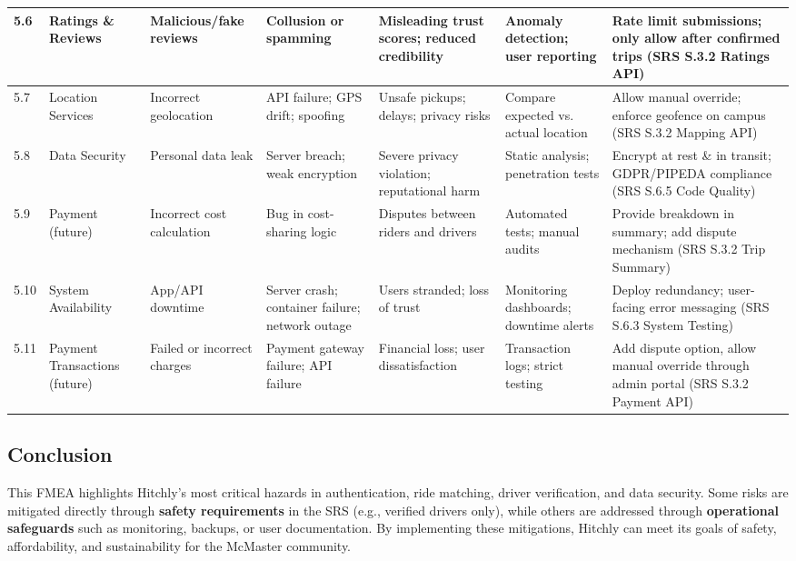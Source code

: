 \documentclass{article}
\begin{document}
\begin{longtable}{|p{0.5cm}|p{2cm}|p{2cm}|p{2cm}|p{2cm}|p{2cm}|p{2cm}|}
5.6 & Ratings \& Reviews & Malicious/fake reviews & Collusion or spamming & Misleading trust scores; reduced credibility & Anomaly detection; user reporting & Rate limit submissions; only allow after confirmed trips (SRS S.3.2 Ratings API) \\ \hline

5.7 & Location Services & Incorrect geolocation & API failure; GPS drift; spoofing & Unsafe pickups; delays; privacy risks & Compare expected vs. actual location & Allow manual override; enforce geofence on campus (SRS S.3.2 Mapping API) \\ \hline

5.8 & Data Security & Personal data leak & Server breach; weak encryption & Severe privacy violation; reputational harm & Static analysis; penetration tests & Encrypt at rest \& in transit; GDPR/PIPEDA compliance (SRS S.6.5 Code Quality) \\ \hline

5.9 & Payment (future) & Incorrect cost calculation & Bug in cost-sharing logic & Disputes between riders and drivers & Automated tests; manual audits & Provide breakdown in summary; add dispute mechanism (SRS S.3.2 Trip Summary) \\ \hline

5.10 & System Availability & App/API downtime & Server crash; container failure; network outage & Users stranded; loss of trust & Monitoring dashboards; downtime alerts & Deploy redundancy; user-facing error messaging (SRS S.6.3 System Testing) \\ \hline

5.11 & Payment Transactions (future) & Failed or incorrect charges & Payment gateway failure; API failure & Financial loss; user dissatisfaction & Transaction logs; strict testing & Add dispute option, allow manual override through admin portal (SRS S.3.2 Payment API) \\ \hline

\end{longtable}
\endgroup



\subsection{Conclusion}
This FMEA highlights Hitchly’s most critical hazards in authentication, ride matching,
driver verification, and data security. Some risks are mitigated directly through
\textbf{safety requirements} in the SRS (e.g., verified drivers only), while others are addressed
through \textbf{operational safeguards} such as monitoring, backups, or user documentation.
By implementing these mitigations, Hitchly can meet its goals of safety, affordability,
and sustainability for the McMaster community.
\end{document}
